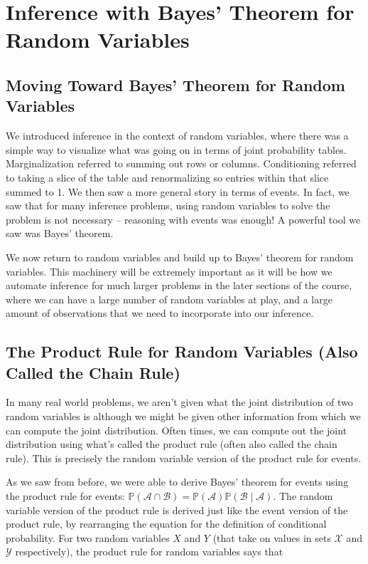 \documentclass[6008notes.tex]{subfiles}
\begin{document}
\graphicspath{ {images/infbayes/} }

\section{Inference with Bayes' Theorem for Random Variables}

\subsection{Moving Toward Bayes' Theorem for Random Variables}

We introduced inference in the context of random variables, where there was a simple way to visualize what was going on in terms of joint probability tables. Marginalization referred to summing out rows or columns. Conditioning referred to taking a slice of the table and renormalizing so entries within that slice summed to 1. We then saw a more general story in terms of events. In fact, we saw that for many inference problems, using random variables to solve the problem is not necessary – reasoning with events was enough! A powerful tool we saw was Bayes' theorem.

We now return to random variables and build up to Bayes' theorem for random variables. This machinery will be extremely important as it will be how we automate inference for much larger problems in the later sections of the course, where we can have a large number of random variables at play, and a large amount of observations that we need to incorporate into our inference.

\subsection{The Product Rule for Random Variables (Also Called the Chain Rule)}

In many real world problems, we aren't given what the joint distribution of two random variables is although we might be given other information from which we can compute the joint distribution. Often times, we can compute out the joint distribution using what's called the product rule (often also called the chain rule). This is precisely the random variable version of the product rule for events.

As we saw from before, we were able to derive Bayes' theorem for events using the product rule for events: $\mathbb {P}(\mathcal{A} \cap \mathcal{B}) = \mathbb {P}(\mathcal{A}) \mathbb {P}(\mathcal{B} \mid \mathcal{A})$. The random variable version of the product rule is derived just like the event version of the product rule, by rearranging the equation for the definition of conditional probability. For two random variables $X$ and $Y$ (that take on values in sets $\mathcal{X}$ and $\mathcal{Y}$ respectively), the product rule for random variables says that
\end{document}
